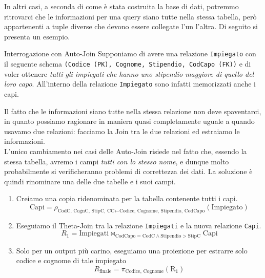 \documentclass[12pt]{report}
\begin{document}
	In altri casi, a seconda di come è stata costruita la base di dati, potremmo ritrovarci che le informazioni per una query siano tutte nella stessa tabella, però appartenenti a tuple diverse che devono essere collegate l'un l'altra. Di seguito si presenta un esempio.
	\begin{esempio}{Interrogazione con Auto-Join}{}
		Supponiamo di avere una relazione \texttt{Impiegato} con il seguente schema \texttt{(Codice (PK), Cognome, Stipendio, CodCapo (FK))} e di voler ottenere \textit{tutti gli impiegati che hanno uno stipendio maggiore di quello del loro capo}. All'interno della relazione \texttt{Impiegato} sono infatti memorizzati anche i capi.
		\smallbreak
		
		Il fatto che le informazioni siano tutte nella stessa relazione non deve spaventarci, in quanto possiamo ragionare in maniera quasi completamente uguale a quando usavamo due relazioni: facciamo la Join tra le due relazioni ed estraiamo le informazioni.\\
		L'unico cambiamento nei casi delle Auto-Join risiede nel fatto che, essendo la stessa tabella, avremo i campi \textit{tutti con lo stesso nome}, e dunque molto probabilmente si verificheranno problemi di correttezza dei dati. La soluzione è quindi rinominare una delle due tabelle e i suoi campi.
		\begin{enumerate}
			\item Creiamo una copia ridenominata per la tabella contenente tutti i capi.
			\[
				\text{Capi} = \rho_{\text{CodC, CognC, StipC, CC} \leftarrow \text{Codice, Cognome, Stipendio, CodCapo}}(\text{Impiegato})
			\]
			
			\item Eseguiamo il Theta-Join tra la relazione \texttt{Impiegati} e la nuova relazione \texttt{Capi}.
			\[
				R_1 = \text{Impiegati} \bowtie_{\text{CodCapo} = \text{CodC} \land \text{Stipendio} > \text{StipC}} \text{Capi}
			\]
			
			\item Solo per un output più carino, eseguiamo una proiezione per estrarre solo codice e cognome di tale impiegato
			\[
				R_{\text{finale}} = \pi_{\text{Codice, Cognome}}(\text{R}_1)
			\]
		\end{enumerate}
	\end{esempio}
	
\end{document}
